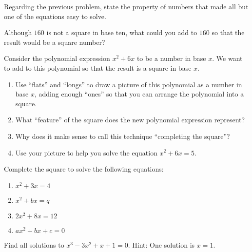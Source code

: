 \begin{prob}
Regarding the previous problem, state the property of numbers that made all but one of the equations easy to solve.  
\end{prob}
\vspace{0.3in}

\begin{prob}
Although $160$ is not a square in base ten, what could you add to $160$ so that the result would be a square number?  
\end{prob}

\begin{prob}
 Consider the polynomial expression $x^2+6x$ to be a number in base $x$.  We want to add to this polynomial so that the result is a square in base $x$.  
\begin{enumerate}
\item Use ``flats'' and ``longs'' to draw a picture of this polynomial as a number in base $x$, adding enough ``ones'' so that you can arrange the polynomial into a square.  
\vspace{0.5in}
\item What ``feature'' of the square does the new polynomial expression represent?  
\item Why does it make sense to call this technique ``completing the square''? 
\item Use your picture to help you solve the equation $x^2+6x=5$.  
\end{enumerate}
\end{prob}

\newpage

\begin{prob}
Complete the square to solve the following equations: 
\begin{enumerate}
\item $x^2+3x=4$
\vspace{.8in}
\item $x^2+bx=q$
\vspace{.8in}
\item $2x^2+8x=12$
\vspace{.8in}
\item $ax^2+bx+c=0$
\vspace{.8in}
\end{enumerate}  
\end{prob}

\begin{prob}
Find all solutions to $x^3-3x^2+x+1=0$.  Hint:  One solution is $x=1$.  
\end{prob}

